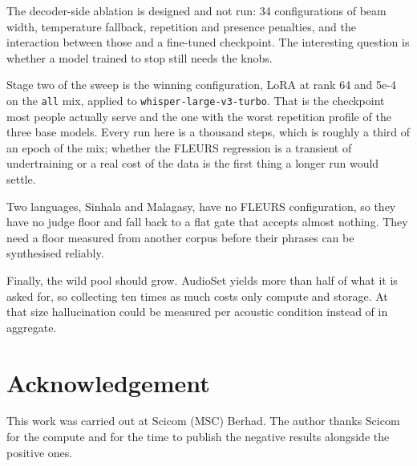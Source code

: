 \documentclass[preprint]{article}
\begin{document}
The decoder-side ablation is designed and not run: 34 configurations of beam width, temperature
fallback, repetition and presence penalties, and the interaction between those and a fine-tuned
checkpoint. The interesting question is whether a model trained to stop still needs the knobs.

Stage two of the sweep is the winning configuration, LoRA at rank 64 and 5e-4 on the
\texttt{all} mix, applied to \texttt{whisper-large-v3-turbo}. That is the checkpoint most
people actually serve and the one with the worst repetition profile of the three base models.
Every run here is a thousand steps, which is roughly a third of an epoch of the mix; whether the
FLEURS regression is a transient of undertraining or a real cost of the data is the first thing
a longer run would settle.

Two languages, Sinhala and Malagasy, have no FLEURS configuration, so they have no judge floor
and fall back to a flat gate that accepts almost nothing. They need a floor measured from
another corpus before their phrases can be synthesised reliably.

Finally, the wild pool should grow. AudioSet yields more than half of what it is asked for, so
collecting ten times as much costs only compute and storage. At that size hallucination could
be measured per acoustic condition instead of in aggregate.

\section{Acknowledgement}

This work was carried out at Scicom (MSC) Berhad. The author thanks Scicom for the compute and
for the time to publish the negative results alongside the positive ones.



\end{document}
